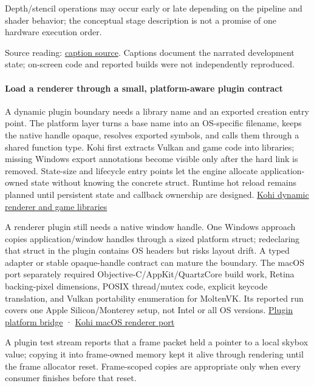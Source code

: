 Depth/stencil operations may occur early or late depending on the pipeline and shader behavior; the conceptual stage description is not a promise of one hardware execution order.

Source reading: \href{https://www.youtube.com/watch?v=KanKG-vd9GA}{caption source}. Captions document the narrated development state; on-screen code and reported builds were not independently reproduced.

\paragraph{Load a renderer through a small, platform-aware plugin contract}\label{load-a-renderer-through-a-small-platform-aware-plugin-contract}

A dynamic plugin boundary needs a library name and an exported creation entry point. The platform layer turns a base name into an OS-specific filename, keeps the native handle opaque, resolves exported symbols, and calls them through a shared function type. Kohi first extracts Vulkan and game code into libraries; missing Windows export annotations become visible only after the hard link is removed. State-size and lifecycle entry points let the engine allocate application-owned state without knowing the concrete struct. Runtime hot reload remains planned until persistent state and callback ownership are designed. \href{https://www.youtube.com/watch?v=oigQGZJ1Yc0}{Kohi dynamic renderer and game libraries}

A renderer plugin still needs a native window handle. One Windows approach copies application/window handles through a sized platform struct; redeclaring that struct in the plugin contains OS headers but risks layout drift. A typed adapter or stable opaque-handle contract can mature the boundary. The macOS port separately required Objective-C/AppKit/QuartzCore build work, Retina backing-pixel dimensions, POSIX thread/mutex code, explicit keycode translation, and Vulkan portability enumeration for MoltenVK. Its reported run covers one Apple Silicon/Monterey setup, not Intel or all OS versions. \href{https://www.youtube.com/watch?v=gLP3WWSvICs}{Plugin platform bridge} · \href{https://www.youtube.com/watch?v=g9tvP4qf5sA}{Kohi macOS renderer port}

A plugin test stream reports that a frame packet held a pointer to a local skybox value; copying it into frame-owned memory kept it alive through rendering until the frame allocator reset. Frame-scoped copies are appropriate only when every consumer finishes before that reset.

